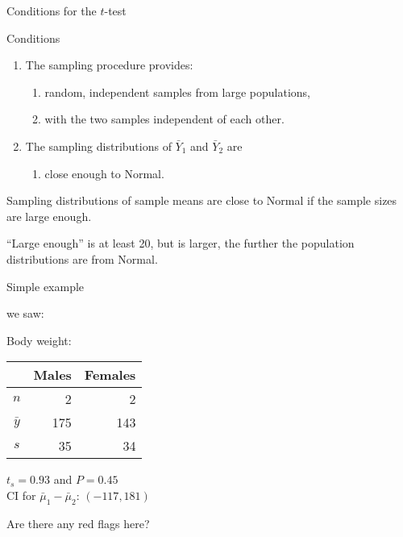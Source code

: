 \begin{frame}{Conditions for the $t$-test}

  \begin{block}{Conditions}
    \begin{enumerate}
      \item The sampling procedure provides:
        \begin{enumerate}
          \item random, independent samples from large populations,
          \item with the two samples independent of each other.
        \end{enumerate}
      \item The sampling distributions of $\bar Y_1$ and $\bar Y_2$ are
        \begin{enumerate}
          \item close enough to Normal.
      \end{enumerate}
    \end{enumerate}
  \end{block}

  \vspace{2em}

  Sampling distributions of sample means are close to Normal if the sample sizes are large enough.\\

  \vspace{2em}

  ``\alert{Large enough}'' is at least 20, but is larger, 
  the further the \alert{population distributions} are from Normal.

\end{frame}

\begin{frame}{Simple example}

   we saw:

  \vspace{2em}


  Body weight:
  \begin{center}
    \begin{tabular}{crr}
       & Males & Females \\
       \hline
       $n$ & 2 & 2 \\
       $\bar y$ & 175 & 143 \\
       $s$ & 35 & 34
     \end{tabular}

   \vspace{2em}

   {$t_s=0.93$ and $P=0.45$}\\
   CI for $\bar \mu_1 - \bar \mu_2$: $(-117,181)$
   \end{center}

   \vspace{2em}
  
   \alert{Are there any red flags here?}
   
\end{frame}


